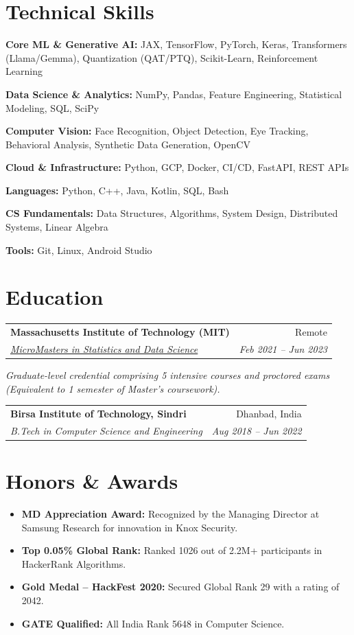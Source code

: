 \documentclass[10pt, letterpaper]{article}
\makeatletter
\newcommand{\resumeItem}[1]{
  \item\small{
    {#1 \vspace{-2pt}}
  }
}
\newcommand{\resumeSubheading}[4]{
  \vspace{-1pt}\item
    \begin{tabular*}{0.98\textwidth}[t]{l@{\extracolsep{\fill}}r}
      \textbf{#1} & {\small\color{darkgray} #2} \\
      \textit{\small#3} & \textit{\small\color{darkgray} #4} \\
    \end{tabular*}\vspace{-7pt}
}
\newcommand{\resumeSubHeadingListStart}{\begin{itemize}[leftmargin=0.15in, label={}]}
\newcommand{\resumeSubHeadingListEnd}{\end{itemize}}
\makeatother
\begin{document}
\section{Technical Skills}
 \begin{itemize}[leftmargin=0.12in, label={}]
    \small{\item{\textbf{Core ML \& Generative AI:} JAX, TensorFlow, PyTorch, Keras, Transformers (Llama/Gemma), Quantization (QAT/PTQ), Scikit-Learn, Reinforcement Learning}}
    \small{\item{\textbf{Data Science \& Analytics:} NumPy, Pandas, Feature Engineering, Statistical Modeling, SQL, SciPy}}
    \small{\item{\textbf{Computer Vision:} Face Recognition, Object Detection, Eye Tracking, Behavioral Analysis, Synthetic Data Generation, OpenCV}}
    \small{\item{\textbf{Cloud \& Infrastructure:} Python, GCP, Docker, CI/CD, FastAPI, REST APIs}}
    \small{\item{\textbf{Languages:} Python, C++, Java, Kotlin, SQL, Bash}}
    \small{\item{\textbf{CS Fundamentals:} Data Structures, Algorithms, System Design, Distributed Systems, Linear Algebra}}
    \small{\item{\textbf{Tools:} Git, Linux, Android Studio}}
 \end{itemize}

\section{Education}
  \resumeSubHeadingListStart
    \resumeSubheading
      {Massachusetts Institute of Technology (MIT)}{Remote}
      {\href{https://micromasters.mit.edu/ds}{MicroMasters in Statistics and Data Science}}{Feb 2021 -- Jun 2023}
      \vspace{-4pt}
      \small{\item{\textit{Graduate-level credential comprising 5 intensive courses and proctored exams (Equivalent to 1 semester of Master's coursework).}}}
    \resumeSubheading
      {Birsa Institute of Technology, Sindri}{Dhanbad, India}
      {B.Tech in Computer Science and Engineering}{Aug 2018 -- Jun 2022}
  \resumeSubHeadingListEnd

\section{Honors \& Awards}
  \resumeSubHeadingListStart
    \resumeItem{\textbf{MD Appreciation Award:} Recognized by the Managing Director at Samsung Research for innovation in Knox Security.}
    \resumeItem{\textbf{Top 0.05\% Global Rank:} Ranked 1026 out of 2.2M+ participants in HackerRank Algorithms.}
    \resumeItem{\textbf{Gold Medal -- HackFest 2020:} Secured Global Rank 29 with a rating of 2042.}
    \resumeItem{\textbf{GATE Qualified:} All India Rank 5648 in Computer Science.}
  \resumeSubHeadingListEnd
\end{document}
